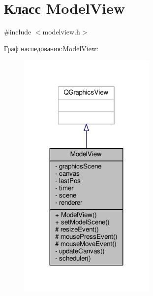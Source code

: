 \hypertarget{class_model_view}{}\section{Класс Model\+View}
\label{class_model_view}


{\ttfamily \#include $<$modelview.\+h$>$}



Граф наследования\+:Model\+View\+:
\nopagebreak
\begin{figure}[H]
\begin{center}
\leavevmode
\includegraphics[width=191pt]{d5/d84/class_model_view__inherit__graph}
\end{center}
\end{figure}


